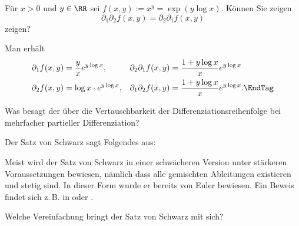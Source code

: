\begin{frage}
  Für $x>0$ und $y\in\RR$ sei $f(x,y):=x^y=\exp(y \log x)$. Können Sie 
  zeigen
  \[
  \partial_1\partial_2f(x,y)=\partial_2\partial_1 f(x,y)
  \] 
  zeigen?
\end{frage}

\begin{antwort}
  Man erhält
  \begin{align*}
    \partial_1 f(x,y)& = \frac{y}{x} e^{y\log x},& 
    \partial_2\partial_1 f(x,y)& = \frac{1+y\log x}{x} e^{y\log x} \\
    \partial_2 f(x,y)& = \log x\cdot e^{y\log x},& 
    \partial_1\partial_2f(x,y)& = \frac{1+y\log x}{x} e^{y\log x}. \EndTag
  \end{align*}
\end{antwort} 

\begin{frage}
  Was besagt der  über die 
  Vertauschbarkeit der Differenziationsreihenfolge bei mehrfacher 
  partieller Differenziation?
\end{frage}


\begin{antwort}
  Der Satz von Schwarz sagt Folgendes aus: 

  \medskip
  \noindent{}

  \medskip\noindent
  Meist wird der Satz von Schwarz in einer schwächeren 
  Version unter stärkeren Voraussetzungen 
  bewiesen, nämlich dass alle gemischten Ableitungen existieren und 
  stetig sind. In dieser Form wurde er bereits von Euler bewiesen. Ein Beweis 
  findet sich z.\,B. in \citep{Kaballo} oder \citep{Koenig}.
  \AntEnd
\end{antwort}

\begin{frage}
  Welche Vereinfachung bringt der Satz von Schwarz mit sich?
\end{frage}

